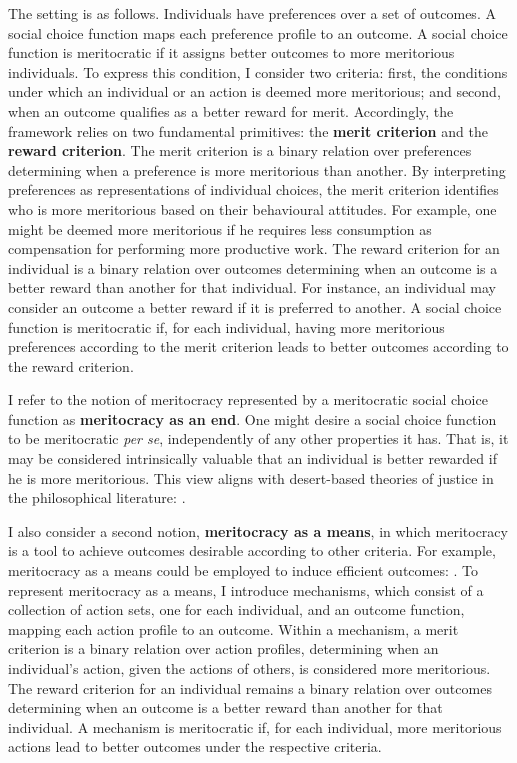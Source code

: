The setting is as follows. Individuals have preferences over a set of outcomes. A social choice function maps each preference profile to an outcome. A social choice function is meritocratic if it assigns better outcomes to more meritorious individuals. To express this condition, I consider two criteria: first, the conditions under which an individual or an action is deemed more meritorious; and second, when an outcome qualifies as a better reward for merit. Accordingly, the framework relies on two fundamental primitives: the \textbf{merit criterion} and the \textbf{reward criterion}. The merit criterion is a binary relation over preferences determining when a preference is more meritorious than another. By interpreting preferences as representations of individual choices, the merit criterion identifies who is more meritorious based on their behavioural attitudes. For example, one might be deemed more meritorious if he requires less consumption as compensation for performing more productive work. The reward criterion for an individual is a binary relation over outcomes determining when an outcome is a better reward than another for that individual. For instance, an individual may consider an outcome a better reward if it is preferred to another. A social choice function is meritocratic if, for each individual, having more meritorious preferences according to the merit criterion leads to better outcomes according to the reward criterion.

I refer to the notion of meritocracy represented by a meritocratic social choice function as \textbf{meritocracy as an end}. One might desire a social choice function to be meritocratic \emph{per se}, independently of any other properties it has. That is, it may be considered intrinsically valuable that an individual is better rewarded if he is more meritorious. This view aligns with desert-based theories of justice in the philosophical literature:  \citep[p. 5]{kaganGeometryDesert2014}.

I also consider a second notion, \textbf{meritocracy as a means}, in which meritocracy is a tool to achieve outcomes desirable according to other criteria. For example, meritocracy as a means could be employed to induce efficient outcomes:  \citep[p. 1]{morganLimitsMeritocracy2022}. To represent meritocracy as a means, I introduce mechanisms, which consist of a collection of action sets, one for each individual, and an outcome function, mapping each action profile to an outcome. Within a mechanism, a merit criterion is a binary relation over action profiles, determining when an individual's action, given the actions of others, is considered more meritorious. The reward criterion for an individual remains a binary relation over outcomes determining when an outcome is a better reward than another for that individual. A mechanism is meritocratic if, for each individual, more meritorious actions lead to better outcomes under the respective criteria.

